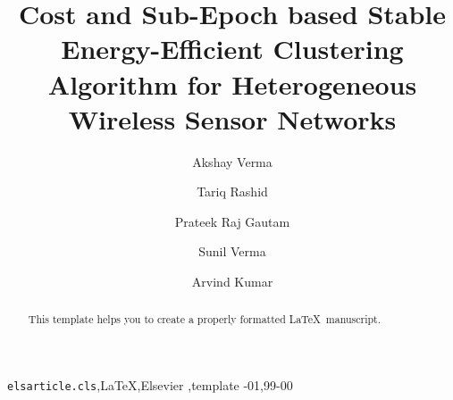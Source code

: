 \documentclass[review]{elsarticle}
\begin{document}
\begin{frontmatter}

\title{Cost and Sub-Epoch based Stable  Energy-Efficient Clustering Algorithm for  Heterogeneous Wireless Sensor Networks}

\author{Akshay Verma}

\author{Tariq Rashid}

\author{Prateek Raj Gautam}





\author{Sunil Verma}

\author{Arvind Kumar}




\begin{abstract}
This template helps you to create a properly formatted \LaTeX\ manuscript.
\end{abstract}

\begin{keyword}
\texttt{elsarticle.cls}\sep \LaTeX\sep Elsevier \sep template
-01\sep  99-00
\end{keyword}

\end{frontmatter}
\end{document}
